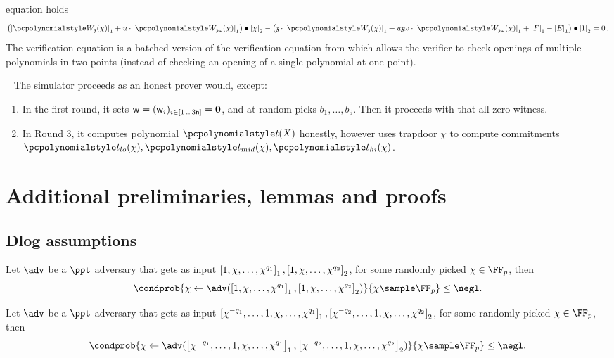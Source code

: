 \documentclass[runningheads,11pt]{llncs}
\let\spvec\vec
\let\vec\accentvec
\let\spvec\vec
\let\vec\spvec
\def\vec#1{\mathchoice{\mbox{\boldmath$\displaystyle#1$}}
  {\mbox{\boldmath$\textstyle#1$}} {\mbox{\boldmath$\scriptstyle#1$}}
  {\mbox{\boldmath$\scriptscriptstyle#1$}}}
\begin{document}
\begin{description}
  equation holds
	\begin{multline}
		\label{eq:ver_eq}
		\left( \gone{\p{W_{\chz}}(\chi)} + u \cdot \gone{\p{W_{\chz
                \omega}}(\chi)} \right) \bullet
		\gtwo{\chi} - %
		\left( \chz \cdot \gone{\p{W_{\chz}}(\chi)} + u \chz \omega \cdot
          \gone{\p{W_{\chz \omega}}(\chi)} + \gone{F} - \gone{E} \right) \bullet
        \gtwo{1} = 0\,.
	\end{multline}
  The verification equation is a batched version of the verification equation
  from \cite{AC:KatZavGol10} which allows the verifier to check openings of
  multiple polynomials in two points (instead of checking an opening of a single
  polynomial at one point).
\end{description}

\ \newline
The \plonk{} simulator proceeds as an honest prover would, except:
\begin{enumerate}
  \item In the first round, it sets $\wit = (\wit_i)_{i \in \range{1}{3 \noofc}}
    = \vec{0}$, and at random picks $b_1, \ldots, b_9$. Then it proceeds with
    that all-zero witness.
  \item In Round 3, it computes polynomial $\pt(X)$ honestly, however uses
    trapdoor $\chi$ to compute commitments
    $\p{t_{lo}}(\chi), \p{t_{mid}}(\chi), \p{t_{hi}}(\chi)$.
  \end{enumerate}


\section{Additional preliminaries, lemmas and proofs}
\subsection{Dlog assumptions}
\label{sec:dlog_assumptions}
\begin{definition}
	Let $\adv$ be a $\ppt$ adversary that gets as input
  $\left[1, \chi, \ldots, \chi^{q_1}\right]_{1}, \left[1, \chi, \ldots, \chi^{q_2}\right]_{2}$, for
  some randomly picked $\chi \in \FF_p$, then
	\[
		\condprob{\chi \gets \adv(\gone{1, \chi, \ldots, \chi^{q_1}}, \gtwo{1, \chi,
        \ldots, \chi^{q_2} })}{\chi \sample \FF_p} \leq \negl.
	\]
\end{definition}

\begin{definition}
  Let $\adv$ be a $\ppt$ adversary that gets as input
  $\left[\chi^{-q_1}, \ldots, 1, \chi, \ldots, \chi^{q_1}\right]_{1}, \left[\chi^{-q_2},
    \ldots, 1, \chi, \ldots, \chi^{q_2}\right]_{2}$, for some randomly picked
  $\chi \in \FF_p$, then
	\[
    \condprob{\chi \gets \adv(\gone{\chi^{-q_1}, \ldots, 1, \chi, \ldots,
        \chi^{q_1}}, \gtwo{\chi^{-q_2}, \ldots, 1, \chi, \ldots, \chi^{q_2}
      })}{\chi \sample \FF_p} \leq \negl.
	\]
\end{definition}
\end{document}

